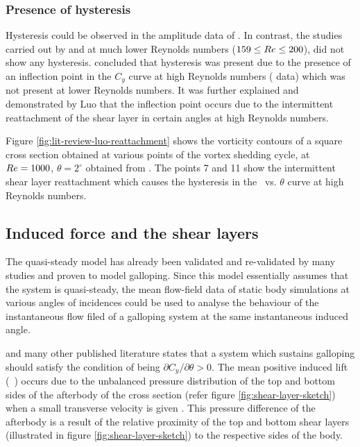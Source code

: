 \subsubsection*{Presence of hysteresis}

Hysteresis could be observed in the amplitude data of \cite{Parkinson1964}. In contrast, the studies carried out by \citet{Barrero-Gil2009} and \citet{Joly2012} at much lower Reynolds numbers ($159\leq Re\leq 200$), did not show any hysteresis. \citet{Luo2003} concluded that hysteresis was present due to the presence of an inflection point in the $C_y$ curve at high Reynolds numbers (\citet{Parkinson1964} data) which was not present at lower Reynolds numbers. It was further explained and demonstrated by Luo that the inflection point occurs due to the intermittent reattachment of the shear layer in certain angles at high Reynolds numbers. 



Figure \ref{fig:lit-review-luo-reattachment} shows the vorticity contours of a square cross section obtained at various points of the vortex shedding cycle, at $Re=1000$, $\theta=2^{\circ}$ obtained from \citet{Luo2003}. The points 7 and 11 show the intermittent shear layer reattachment which causes the hysteresis in the \cy\ vs. $\theta$ curve at high Reynolds numbers.

\vspace{20mm}   

\subsection{Induced force and the shear layers}
\label{subsec:c_y and shear layers}

 The quasi-steady model has already been validated and re-validated by many studies \citep{Parkinson1964,Barrero-Gil2009,Luo2003} and proven to model galloping. Since this model essentially assumes that the system is quasi-steady, the mean flow-field data of static body simulations at various angles of incidences could be used to analyse the behaviour of the instantaneous flow filed of a galloping system at the same instantaneous induced angle. 
 
 





\citet{Paidoussis2010,Parkinson1964,Barrero-Gil2010a} and many other published literature states that  a system which sustains galloping should satisfy the condition of being $\partial C_y/\partial \theta>0$. The mean positive induced lift (\cy\ ) occurs due to the unbalanced pressure distribution of the top and bottom sides of the afterbody of the cross section (refer figure \ref{fig:shear-layer-sketch}) when a small transverse velocity is given \citep{Parkinson1989}. This pressure difference of the afterbody is a result of the relative proximity of the top and bottom shear layers (illustrated in figure \ref{fig:shear-layer-sketch}) to the respective sides of the body. 

